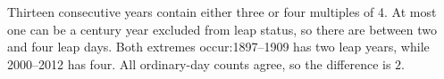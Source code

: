 Thirteen consecutive years contain either three or four multiples of 4. At most one can be a century year excluded from leap status, so there are between two and four leap days. Both extremes occur:1897--1909 has two leap years, while 2000--2012 has four. All ordinary-day counts agree, so the difference is $\boxed2$.
